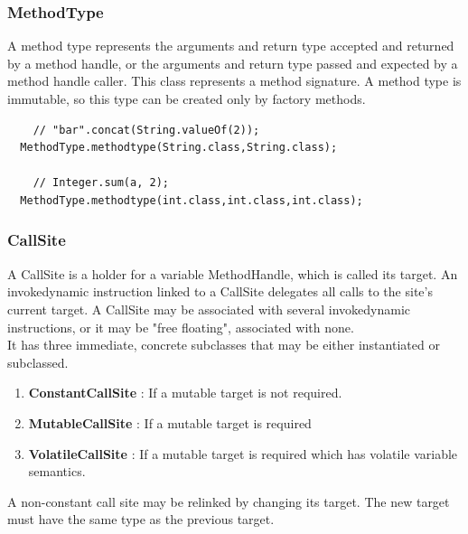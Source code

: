 \documentclass{sigplanconf}
\def \DALVIK{\mbox{Dalvik}\xspace}
\begin{document}
        


      \subsubsection{MethodType}
        A method type represents the arguments and return type accepted and returned by a method handle,
        or the arguments and return type passed and expected by a method handle caller.
        This class represents a method signature.
        A method type is immutable, so this type can be created only by factory methods.
        

        {\tiny
          \begin{verbatim}
    // "bar".concat(String.valueOf(2));
  MethodType.methodtype(String.class,String.class);

    // Integer.sum(a, 2);
  MethodType.methodtype(int.class,int.class,int.class);
          \end{verbatim}
        }

      

      \subsubsection{CallSite}
        A CallSite is a holder for a variable MethodHandle, which is called its target.
        An invokedynamic instruction linked to a CallSite delegates all calls to the site's current target.
        A CallSite may be associated with several invokedynamic instructions,
        or it may be "free floating", associated with none.\\

        It has three immediate, concrete subclasses that may be either instantiated or subclassed.
        \begin{enumerate}
          \item \textbf{ConstantCallSite} : If a mutable target is not required.
          \item \textbf{MutableCallSite}  : If a mutable target is required
          \item \textbf{VolatileCallSite} : If a mutable target is required which has volatile variable semantics.
        \end{enumerate}
        A non-constant call site may be relinked by changing its target.
        The new target must have the same type as the previous target.
\end{document}
